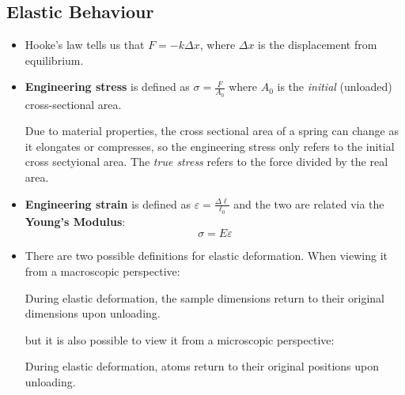 \subsection{Elastic Behaviour}
\begin{itemize}
    \item Hooke's law tells us that $F=-k\Delta x$, where $\Delta x$ is the displacement from equilibrium.
    \item \textbf{Engineering stress} is defined as $\sigma = \frac{F}{A_0}$ where $A_0$ is the \textit{initial} (unloaded) cross-sectional area.
    \begin{warning}
        Due to material properties, the cross sectional area of a spring can change as it elongates or compresses, so the engineering stress only refers to the initial cross sectyional area. The \textit{true stress} refers to the force divided by the real area.
    \end{warning}
    \item \textbf{Engineering strain} is defined as $\varepsilon = \frac{\Delta \ell}{\ell_0}$ and the two are related via the \textbf{Young's Modulus}:
    \begin{equation}
        \sigma = E\varepsilon
    \end{equation}
    \item There are two possible definitions for elastic deformation. When viewing it from a macroscopic perspective:
    \begin{definition}
        During elastic deformation, the sample dimensions return to their original dimensions upon unloading.
    \end{definition}
    but it is also possible to view it from a microscopic perspective:
    \begin{definition}
        During elastic deformation, atoms return to their original positions upon unloading.
    \end{definition}
\end{itemize}
